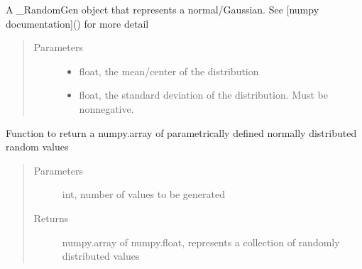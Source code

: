 \documentclass[letterpaper,10pt,english]{sphinxmanual}
\begin{document}
\begin{fulllineitems}
\label{\detokenize{simulation:risk_dash.simgen.NormalDistribution}}
\sphinxAtStartPar
A \_RandomGen object that represents a normal/Gaussian. See {[}numpy documentation{]}() for more detail
\begin{quote}\begin{description}
\item[{Parameters}] \leavevmode\begin{itemize}
\item {} 
\sphinxAtStartPar
{} \textendash{} float, the mean/center of the distribution

\item {} 
\sphinxAtStartPar
{} \textendash{} float, the standard deviation of the distribution. Must be non\sphinxhyphen{}negative.

\end{itemize}

\end{description}\end{quote}

\begin{fulllineitems}
\label{\detokenize{simulation:risk_dash.simgen.NormalDistribution.generate}}
\sphinxAtStartPar
Function to return a numpy.array of parametrically defined normally distributed random values
\begin{quote}\begin{description}
\item[{Parameters}] \leavevmode
\sphinxAtStartPar
{} \textendash{} int, number of values to be generated

\item[{Returns}] \leavevmode
\sphinxAtStartPar
numpy.array of numpy.float, represents a collection of randomly distributed values

\end{description}\end{quote}

\end{fulllineitems}


\end{fulllineitems}
\end{document}

